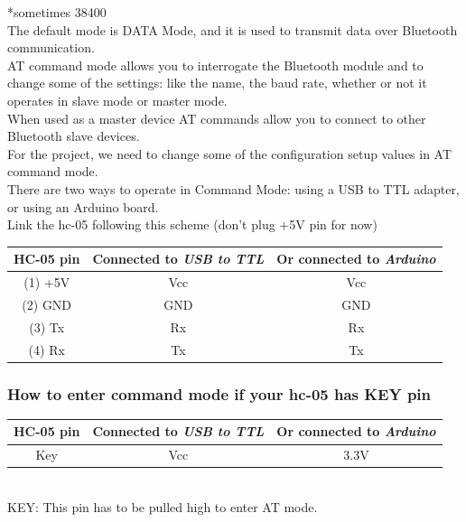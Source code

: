 *sometimes 38400\\

The default mode is DATA Mode, and it is used to transmit data over Bluetooth communication.\\
AT command mode allows you to interrogate the Bluetooth module and to change some of the settings: like the name, the baud rate, whether or not it operates in slave mode or master mode.\\
When used as a master device AT commands allow you to connect to other Bluetooth slave devices.\\
For the project, we need to change some of the configuration setup values in AT command mode. \\

There are two ways to operate in Command Mode: using a USB to TTL adapter, or using an Arduino board.\\
Link the hc-05 following this scheme (don’t plug +5V pin for now)\\

\begin{tabular}{|c|c|c|}
	\hline 
	\textbf{HC-05 pin} & \textbf{Connected to \textit{USB to TTL}} & \textbf{Or connected to \textit{Arduino}} \\ 
	\hline 
	(1) +5V & Vcc & Vcc \\ 
	\hline 
	(2) GND & GND & GND \\ 
	\hline 
	(3) Tx & Rx & Rx \\ 
	\hline 
	(4) Rx & Tx & Tx \\ 
	\hline 
\end{tabular} 

\subsubsection{How to enter command mode if your hc-05 has KEY pin}
\begin{tabular}{|c|c|c|}
	\hline 
	\textbf{HC-05 pin} & \textbf{Connected to \textit{USB to TTL}} & \textbf{Or connected to \textit{Arduino}} \\ 
	\hline 
	Key & Vcc & 3.3V \\ 
	\hline 
\end{tabular} \\

KEY: This pin has to be pulled high to enter AT mode.

